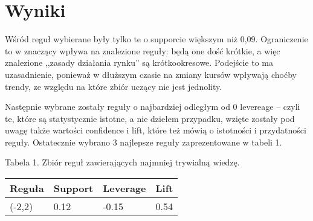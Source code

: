 \documentclass[a4paper,10pt]{article}
\begin{document}
\section{Wyniki}
Wśród reguł wybierane były tylko te o supporcie większym niż 0,09. Ograniczenie to w znaczący wpływa na znalezione reguły: będą one dość krótkie, 
a więc znalezione ,,zasady działania rynku'' są krótkookresowe. Podejście to ma uzasadnienie, ponieważ w dłuższym czasie na zmiany kursów wpływają 
choćby trendy, ze względu na które zbiór uczący nie jest jednolity.

Następnie wybrane zostały reguły o najbardziej odległym od 0 levereage – czyli te, które są statystycznie istotne, a nie dziełem przypadku, 
wzięte zostały pod uwagę także wartości confidence i lift, które też mówią o istotności i przydatności reguły. Ostatecznie wybrano 3 najlepsze 
reguły zaprezentowane w tabeli 1.

\begin{center}
{\small Tabela 1. Zbiór reguł zawierających najmniej trywialną wiedzę.}
\\[0.1cm] 
\begin{tabular}{|l|l|l|l|} 
\hline
\bf{Reguła} & \bf{Support} & \bf{Leverage} & \bf{Lift} \\ \hline
(-2,2) & 0.12 & -0.15 & 0.54 \\ \hline
\end{tabular}
\end{center}
\end{document}

